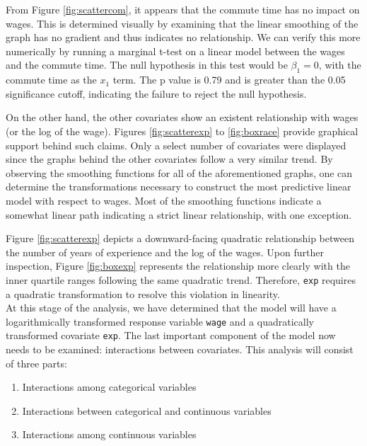 \documentclass{article}
\begin{document}
      From Figure \ref{fig:scattercom}, it appears that the commute time has no impact
      on wages. This is determined visually by examining that the linear smoothing of the graph
      has no gradient and thus indicates no relationship. We can verify this more numerically
      by running a marginal t-test on a linear model between the wages and the commute time.
      The null hypothesis in this test would be $\beta_1 = 0$, with the commute time
      as the $x_1$ term. The p value is 0.79 and is greater than the 0.05 significance
      cutoff, indicating the failure to reject the null hypothesis.

      On the other hand, the other covariates show an existent relationship with wages
      (or the log of the wage). Figures \ref{fig:scatterexp} to \ref{fig:boxrace} provide
      graphical support behind such claims. Only a select number of covariates were displayed
      since the graphs behind the other covariates follow a very similar trend. By
      observing the smoothing functions for all of the aforementioned graphs,
      one can determine the transformations necessary to construct the
      most predictive linear model with respect to wages. Most of the smoothing
      functions indicate a somewhat linear path indicating a strict linear relationship,
      with one exception.

      Figure \ref{fig:scatterexp} depicts a downward-facing
      quadratic relationship between the number of years of experience and the log
      of the wages. Upon further inspection, Figure \ref{fig:boxexp} represents
      the relationship more clearly with the inner quartile ranges following the
      same quadratic trend. Therefore, \texttt{exp} requires a quadratic transformation
      to resolve this violation in linearity. \\


      At this stage of the analysis, we have determined that the model will have
      a logarithmically transformed response variable \texttt{wage} and a quadratically
      transformed covariate \texttt{exp}. The last important component of the model
      now needs to be examined: interactions between covariates. This analysis will
      consist of three parts:
      \begin{enumerate}
        \item Interactions among categorical variables
        \item Interactions between categorical and continuous variables
        \item Interactions among continuous variables
      \end{enumerate}
\end{document}

